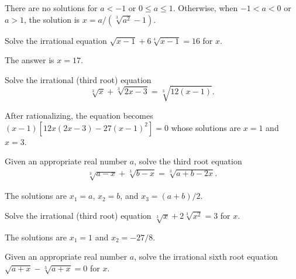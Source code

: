 \documentclass[12pt,a4paper]{memoir}
\theoremstyle{definition}
\begin{document}
\begin{solution}
	There are no solutions for $a<-1$ or $0 \leq a \leq 1$. Otherwise, when $-1<a<0$ or $a>1$, the solution is $x=a/(\sqrt[3]{a^2}-1)$.
\end{solution}

\begin{question}\label{p:irrational-C}
	Solve the irrational equation $\sqrt{x-1}+6\sqrt[4]{x-1}=16$ for $x$.
\end{question}

\begin{solution}
	The answer is $x=17$.
\end{solution}

\begin{question}\label{p:irrational-D}
	Solve the irrational (third root) equation \[\sqrt[3]{x}+\sqrt[3]{2x-3}=\sqrt[3]{12(x-1)}.\]
\end{question}

\begin{solution}
	After rationalizing, the equation becomes $(x-1)[12x(2x-3)-27(x-1)^2]=0$ whose solutions are $x=1$ and $x=3$.
\end{solution}


\begin{question}\label{p:irrational-E}
	Given an appropriate real number $a$, solve the third root equation
	\begin{align*}
		\sqrt[3]{a-x}+\sqrt[3]{b-x}=\sqrt[3]{a+b-2x}.
	\end{align*}
\end{question}

\begin{solution}
	The solutions are $x_1=a$, $x_2=b$, and $x_3=(a+b)/2$.
\end{solution}


\begin{question}\label{p:irrational-F}
	Solve the irrational (third root) equation $\sqrt[3]{x}+2\sqrt[3]{x^2}=3$ for $x$.
\end{question}

\begin{solution}
	The solutions are $x_1=1$ and $x_2=-27/8$.
\end{solution}

\begin{question}\label{p:irrational-G}
	Given an appropriate real number $a$, solve the irrational sixth root equation $\sqrt{a+x}-\sqrt[3]{a+x}=0$ for $x$.
\end{question}
\end{document}
